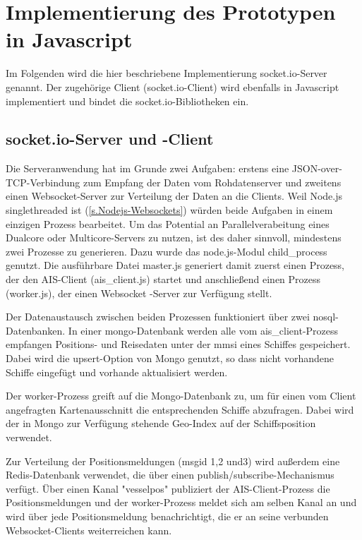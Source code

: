 \section{Implementierung des Prototypen in Javascript}

Im Folgenden wird die hier beschriebene Implementierung socket.io-Server genannt. Der zugehörige Client (socket.io-Client) wird ebenfalls in Javascript implementiert und bindet die socket.io-Bibliotheken ein.

\subsection{socket.io-Server und -Client}
Die Serveranwendung hat im Grunde zwei Aufgaben: erstens eine JSON-over-TCP-Verbindung zum Empfang der Daten vom Rohdatenserver und zweitens einen Websocket-Server zur Verteilung der Daten an die Clients.
Weil Node.js singlethreaded ist (\ref{s.Nodejs-Websockets}) würden beide Aufgaben in einem einzigen Prozess bearbeitet. Um das Potential an Parallelverabeitung eines Dualcore oder Multicore-Servers zu nutzen, ist des daher sinnvoll, mindestens zwei Prozesse zu generieren. Dazu wurde das node.js-Modul child\_process genutzt. Die ausführbare Datei master.js generiert damit zuerst einen Prozess, der den AIS-Client (ais\_client.js) startet und anschließend einen Prozess (worker.js), der einen Websocket -Server zur Verfügung stellt.

Der Datenaustausch zwischen beiden Prozessen funktioniert über zwei nosql-Datenbanken. In einer mongo-Datenbank werden alle vom ais\_client-Prozess empfangen Positions- und Reisedaten  unter der mmsi eines Schiffes gespeichert. Dabei wird die upsert-Option von Mongo genutzt, so dass nicht vorhandene Schiffe eingefügt und vorhande aktualisiert werden.

Der worker-Prozess greift auf die Mongo-Datenbank zu, um für einen vom Client angefragten Kartenausschnitt die entsprechenden Schiffe abzufragen. Dabei wird der in Mongo zur Verfügung stehende Geo-Index auf der Schiffsposition verwendet.

Zur Verteilung der Positionsmeldungen (msgid 1,2 und3)  wird außerdem eine Redis-Datenbank verwendet, die über einen publish/subscribe-Mechanismus verfügt. Über einen Kanal "vesselpos" publiziert der AIS-Client-Prozess die Positionsmeldungen und der worker-Prozess meldet sich am selben Kanal an und wird über jede Positionsmeldung benachrichtigt, die er an seine verbunden Websocket-Clients weiterreichen kann.

